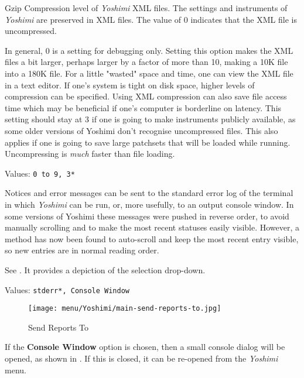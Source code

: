    Gzip Compression level of \textsl{Yoshimi} XML files.
   The settings and instruments of
   \textsl{Yoshimi}
   are preserved in XML files.
   The value of 0 indicates that the XML file is uncompressed.

   In general, 0 is a setting for debugging only.  Setting this
   option makes the XML files a bit larger, perhaps larger by a factor of more
   than 10, making a 10K file into a 180K file.  For a little "wasted" space
   and time, one can view the XML file in a text editor.  If
   one's system is tight on disk space, higher levels of compression can be
   specified.  Using XML compression can also save file access time which may
   be beneficial if one's computer is borderline on latency.  This setting
   should stay at 3 if one is going to make instruments publicly available, as
   some older versions of Yoshimi don't recognise uncompressed files. This
   also applies if one is going to save large patchsets that will be loaded
   while running. Uncompressing is \textsl{much} faster than file loading.

   Values: \texttt{0 to 9, 3*}

   Notices and error messages can be sent to the standard error log of
   the terminal in which
   \textsl{Yoshimi} can be run, or, more usefully, to
   an output console window.
   In some versions of Yoshimi these messages were pushed in reverse order, to
   avoid manually scrolling and to make the most recent statuses easily visible.
   However, a method has now been found to auto-scroll and keep the most recent
   entry visible, so new entries are in normal reading order.

   See .
   It provides a depiction of the selection drop-down.

   Values: \texttt{stderr*, Console Window}

\begin{figure}[H]
   \centering
   \texttt{[image: menu/Yoshimi/main-send-reports-to.jpg]}
   \caption[Send Reports]{Send Reports To}
   \label{fig:send_reports_to}
\end{figure}

   If the \textbf{Console Window} option is chosen, then a small console dialog
   will be opened, as shown in . If this is closed,
   it can be re-opened from the \textsl{Yoshimi} menu.

